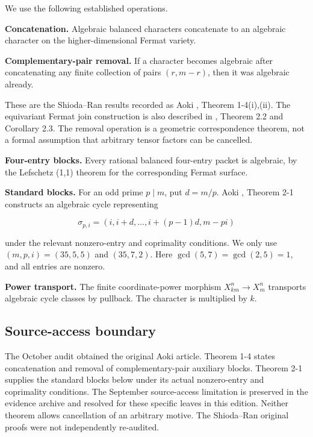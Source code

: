 We use the following established operations.

\textbf{Concatenation.} Algebraic balanced characters concatenate to an
algebraic character on the higher-dimensional Fermat variety.

\textbf{Complementary-pair removal.} If a character becomes algebraic
after concatenating any finite collection of pairs \((r,m-r)\), then it
was algebraic already.

These are the Shioda--Ran results recorded as Aoki \cite{Aoki}, Theorem
1-4(i),(ii). The equivariant Fermat join construction is also described
in \cite{DaSilvaFermat}, Theorem 2.2 and Corollary 2.3. The removal
operation is a geometric correspondence theorem, not a formal assumption
that arbitrary tensor factors can be cancelled.

\textbf{Four-entry blocks.} Every rational balanced four-entry packet is
algebraic, by the Lefschetz (1,1) theorem for the corresponding Fermat
surface.

\textbf{Standard blocks.} For an odd prime \(p\mid m\), put \(d=m/p\).
Aoki \cite{Aoki}, Theorem 2-1 constructs an algebraic cycle representing

\[
\sigma_{p,i}=(i,i+d,\ldots,i+(p-1)d,m-pi)
\]

under the relevant nonzero-entry and coprimality conditions. We only use
\((m,p,i)=(35,5,5)\) and \((35,7,2)\). Here \(\gcd(5,7)=\gcd(2,5)=1\),
and all entries are nonzero.

\textbf{Power transport.} The finite coordinate-power morphism
\(X_{km}^n\to X_m^n\) transports algebraic cycle classes by pullback.
The character is multiplied by \(k\).

\hypertarget{transfer210-source-access-boundary}{%
\subsection{Source-access boundary}\label{transfer210-source-access-boundary}}

The October audit obtained the original Aoki article. Theorem 1-4 states
concatenation and removal of complementary-pair auxiliary blocks.
Theorem 2-1 supplies the standard blocks below under its actual
nonzero-entry and coprimality conditions. The September source-access
limitation is preserved in the evidence archive and resolved for these
specific leaves in this edition. Neither theorem allows cancellation of
an arbitrary motive. The Shioda--Ran original proofs were not
independently re-audited.

